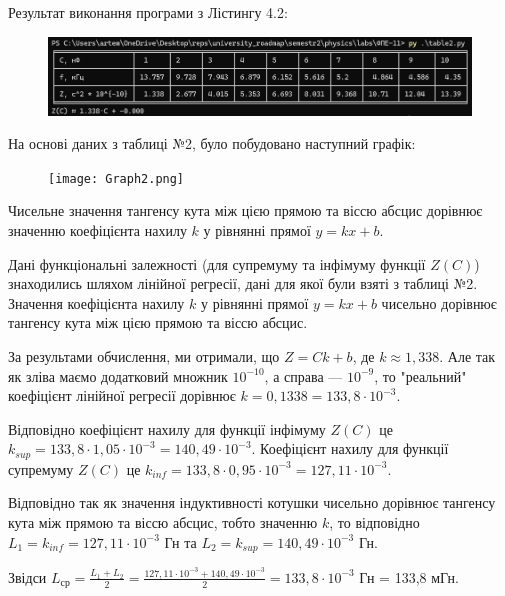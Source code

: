 \documentclass[12pt,a4paper]{article}
\begin{document}
    \newpage

    Результат виконання програми з Лістингу 4.2:

    \begin{figure}[ht]
        \includegraphics[width=1.0\textwidth]{table2_photo.png}
    \end{figure}

    На основі даних з таблиці №2, було побудовано наступний графік:

    \begin{figure}[ht]
        \texttt{[image: Graph2.png]}
    \end{figure}

    \setlength{\parindent}{1.5em}

    Чисельне значення тангенсу кута між цією прямою та віссю абсцис дорівнює значенню коефіцієнта нахилу $k$ у рівнянні прямої $y = kx + b$.

    Дані функціональні залежності (для супремуму та інфімуму функції $Z(C)$) знаходились шляхом лінійної регресії, дані для якої були взяті з таблиці №2.
    Значення коефіцієнта нахилу $k$ у рівнянні прямої $y = kx + b$  чисельно дорівнює тангенсу кута між цією прямою та віссю абсцис.

    За результами обчислення, ми отримали, що $Z = Ck + b$, де $k \approx 1,338$. Але так як зліва маємо додатковий множник $10^{-10}$, а справа --- $10^{-9}$, то
    "реальний"  коефіцієнт лінійної регресії дорівнює $k = 0,1338 = 133,8 \cdot 10^{-3}$.

    Відповідно коефіцієнт нахилу для функції інфімуму $Z(C)$ це $k_{sup} = 133,8 \cdot 1,05 \cdot 10^{-3} = 140,49 \cdot 10^{-3}$.
    Коефіцієнт нахилу для функції супремуму $Z(C)$ це $k_{inf} = 133,8 \cdot 0,95 \cdot 10^{-3} = 127,11 \cdot 10^{-3}$.

    Відповідно так як значення індуктивності котушки чисельно дорівнює тангенсу кута між прямою та віссю абсцис, тобто значенню $k$, то відповідно
    $L_1 = k_{inf} = 127,11 \cdot 10^{-3}$ Гн та $L_2 = k_{sup} = 140,49 \cdot 10^{-3}$ Гн.

    Звідси $\displaystyle L_{\text{ср}} = \frac{L_1 + L_2}{2} = \frac{127,11 \cdot 10^{-3} + 140,49 \cdot 10^{-3}}{2} = 133,8 \cdot 10^{-3}$ Гн = 133,8 мГн.
\end{document}
